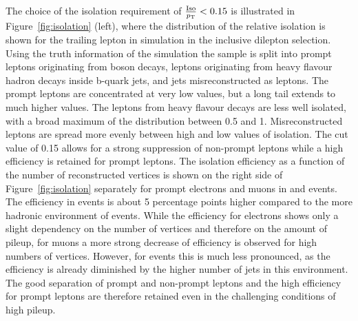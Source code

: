 The choice of the isolation requirement of $\frac{\text{Iso}}{p_{\mathrm{T}}}< 0.15$ is illustrated in Figure~\ref{fig:isolation} (left), where the distribution of the relative isolation is shown for the trailing lepton in \ttbar simulation in the inclusive dilepton selection. Using the truth information of the simulation the sample is split into prompt leptons originating from \W boson decays, leptons originating from heavy flavour hadron decays inside b-quark jets, and jets misreconstructed as leptons. The prompt leptons are concentrated at very low values, but a long tail extends to much higher values. The leptons from heavy flavour decays are less well isolated, with a broad maximum of the distribution between 0.5 and 1. Misreconstructed leptons are spread more evenly between high and low values of isolation. The cut value of 0.15 allows for a strong suppression of non-prompt leptons while a high efficiency is retained for prompt leptons. The isolation efficiency as a function of the number of reconstructed vertices is shown on the right side of Figure~\ref{fig:isolation} separately for prompt electrons and muons in \ttbar and \zjets events. The efficiency in \zjets events is about 5 percentage points higher compared to the more hadronic environment of \ttbar events. While the efficiency for electrons shows only a slight dependency on the number of vertices and therefore on the amount of pileup, for muons a more strong decrease of efficiency is observed for high numbers of vertices. However, for \ttbar events this is much less pronounced, as the efficiency is already diminished by the higher number of jets in this environment. The good separation of prompt and non-prompt leptons and the high efficiency for prompt leptons are therefore  retained even in the challenging conditions of high pileup. 

